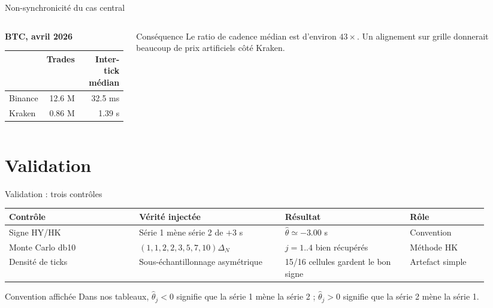 \documentclass[10pt,aspectratio=169]{beamer}
\begin{document}
\begin{frame}{Non-synchronicité du cas central}
  \small
  \begin{columns}[T]
    \begin{column}{0.46\linewidth}
      \textbf{BTC, avril 2026}
      \vspace{0.15cm}

      \begin{tabular}{lrr}
        \toprule
        & \textbf{Trades} & \textbf{Inter-tick médian} \\
        \midrule
        Binance & 12.6 M & 32.5 ms \\
        Kraken & 0.86 M & 1.39 s \\
        \bottomrule
      \end{tabular}
    \end{column}
    \begin{column}{0.48\linewidth}
      \begin{block}{Conséquence}
        Le ratio de cadence médian est d'environ \(43\times\). Un alignement sur grille donnerait beaucoup de prix artificiels côté Kraken.
      \end{block}

    \end{column}
  \end{columns}
\end{frame}

\section{Validation}

\begin{frame}{Validation : trois contrôles}
  \scriptsize
  \begin{tabular}{p{0.25\linewidth}p{0.29\linewidth}p{0.24\linewidth}p{0.15\linewidth}}
    \toprule
    \textbf{Contrôle} & \textbf{Vérité injectée} & \textbf{Résultat} & \textbf{Rôle} \\
    \midrule
    Signe HY/HK & Série 1 mène série 2 de \(+3\) s & \(\hat\theta \simeq -3.00\) s & Convention \\
    Monte Carlo db10 & \((1,1,2,2,3,5,7,10)\Delta_N\) & \(j=1..4\) bien récupérés & Méthode HK \\
    Densité de ticks & Sous-échantillonnage asymétrique & 15/16 cellules gardent le bon signe & Artefact simple \\
    \bottomrule
  \end{tabular}

  \vspace{0.45cm}
  \begin{exampleblock}{Convention affichée}
    Dans nos tableaux, \(\hat\theta_j < 0\) signifie que la série 1 mène la série 2 ; \(\hat\theta_j > 0\) signifie que la série 2 mène la série 1.
  \end{exampleblock}
\end{frame}
\end{document}
